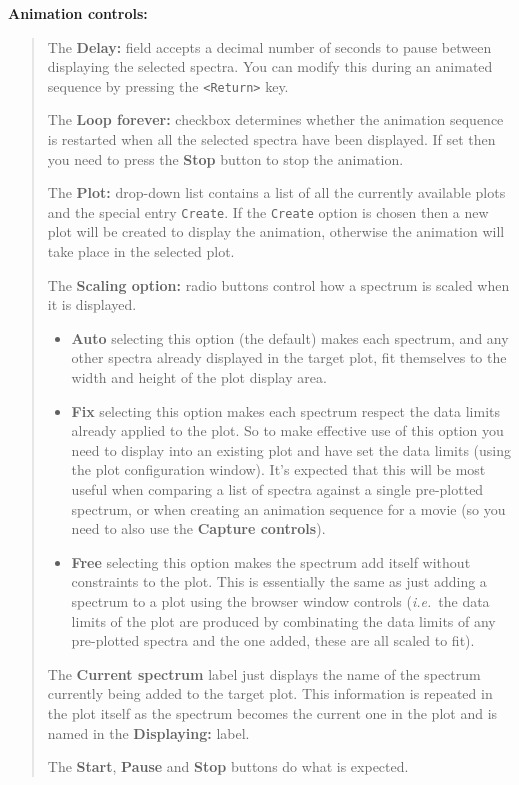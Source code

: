 \documentclass[twoside,11pt,nolof]{starlink}
\newcommand{\labelitem}[1]{\textbf{#1}}
\providecommand{\hitext}[1]{\texttt{#1}}
\providecommand{\ie}{\textit{i.e.}}
\providecommand{\subheading}[1]{\textbf{\large{#1}}}
\begin{document}
\subheading{Animation controls:}
\begin{quote}
 The \labelitem{Delay:} field accepts a decimal number of seconds to
 pause between displaying the selected spectra. You can modify this
 during an animated sequence by pressing the \hitext{<Return>} key.

 The \labelitem{Loop forever:} checkbox determines whether the
 animation sequence is restarted when all the selected spectra have
 been displayed. If set then you need to press the \labelitem{Stop}
 button to stop the animation.

 The \labelitem{Plot:} drop-down list contains a list of all the
 currently available plots and the special entry \hitext{Create}. If
 the \hitext{Create} option is chosen then a new plot will be created
 to display the animation, otherwise the animation will take place in
 the selected plot.

 The \labelitem{Scaling option:} radio buttons control how a spectrum
 is scaled when it is displayed.

 \begin{itemize}
  \item \labelitem{Auto} selecting this option (the default) makes each
  spectrum, and any other spectra already displayed in the target plot,
  fit themselves to the width and height of the plot display area.

  \item \labelitem{Fix} selecting this option makes each spectrum respect
  the data limits already applied to the plot. So to make effective use
  of this option you need to display into an existing plot and have set
  the data limits (using the plot configuration window). It's expected
  that this will be most useful when comparing a list of spectra against
  a single pre-plotted spectrum, or when creating an animation sequence
  for a movie (so you need to also use the \labelitem{Capture controls}).

  \item \labelitem{Free} selecting this option makes the spectrum add
  itself without constraints to the plot. This is essentially the same
  as just adding a spectrum to a plot using the browser window controls
  (\ie\ the data limits of the plot are produced by combinating the
  data limits of any pre-plotted spectra and the one added, these are
  all scaled to fit).
 \end{itemize}

 The \labelitem{Current spectrum} label just displays the name of the
 spectrum currently being added to the target plot. This information is
 repeated in the plot itself as the spectrum becomes the current one in
 the plot and is named in the \labelitem{Displaying:} label.

 The \labelitem{Start}, \labelitem{Pause} and \labelitem{Stop} buttons
 do what is expected.
\end{quote}
\end{document}
